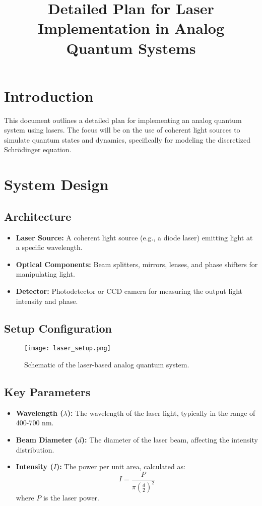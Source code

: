 \documentclass{article}
\title{Detailed Plan for Laser Implementation in Analog Quantum Systems}
\author{}
\date{}
\begin{document}
\maketitle

\section{Introduction}
This document outlines a detailed plan for implementing an analog quantum system using lasers. The focus will be on the use of coherent light sources to simulate quantum states and dynamics, specifically for modeling the discretized Schrödinger equation.

\section{System Design}

\subsection{Architecture}

\begin{itemize}
    \item \textbf{Laser Source:} A coherent light source (e.g., a diode laser) emitting light at a specific wavelength.
    \item \textbf{Optical Components:} Beam splitters, mirrors, lenses, and phase shifters for manipulating light.
    \item \textbf{Detector:} Photodetector or CCD camera for measuring the output light intensity and phase.
\end{itemize}

\subsection{Setup Configuration}

\begin{figure}[h]
    \centering
    \texttt{[image: laser\_setup.png]} %
    \caption{Schematic of the laser-based analog quantum system.}
    \label{fig:laser_setup}
\end{figure}

\subsection{Key Parameters}
\begin{itemize}
    \item \textbf{Wavelength (\(\lambda\)):} The wavelength of the laser light, typically in the range of 400-700 nm.
    \item \textbf{Beam Diameter (\(d\)):} The diameter of the laser beam, affecting the intensity distribution.
    \item \textbf{Intensity (\(I\)):} The power per unit area, calculated as:
    \[
    I = \frac{P}{\pi \left(\frac{d}{2}\right)^2}
    \]
    where \(P\) is the laser power.
\end{itemize}
\end{document}
